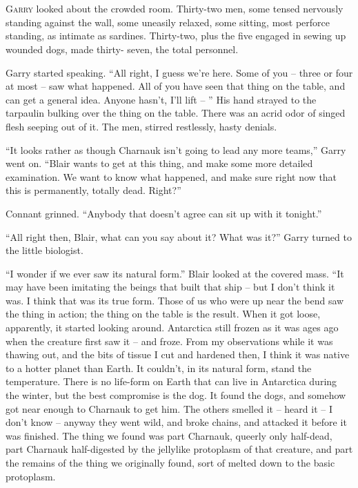 \documentclass[letterpaper,openany,12pt]{memoir}		%
\begin{document}
\chapter[Chapter 6]{}

\lettrine[lines=3,findent=2pt,nindent=2pt]{G}{arry} looked about the crowded
room. Thirty-two men, some tensed nervously standing against the wall, some
uneasily relaxed, some sitting, most perforce standing, as intimate as sardines.
Thirty-two, plus the five engaged in sewing up wounded dogs, made thirty- seven,
the total personnel.

Garry started speaking. ``All right, I guess we're here. Some of you -- three or
four at most -- saw what happened. All of you have seen that thing on the table,
and can get a general idea. Anyone hasn't, I'll lift -- '' His hand strayed to
the tarpaulin bulking over the thing on the table. There was an acrid odor of
singed flesh seeping out of it. The men, stirred restlessly, hasty denials.

``It looks rather as though Charnauk isn't going to lead any more teams,'' Garry
went on. ``Blair wants to get at this thing, and make some more detailed
examination. We want to know what happened, and make sure right now that this is
permanently, totally dead. Right?''

Connant grinned. ``Anybody that doesn't agree can sit up with it tonight.''

``All right then, Blair, what can you say about it? What was it?'' Garry turned
to the little biologist.

``I wonder if we ever saw its natural form.'' Blair looked at the covered mass.
``It may have been imitating the beings that built that ship -- but I don't
think it was. I think that was its true form. Those of us who were up near the
bend saw the thing in action; the thing on the table is the result. When it got
loose, apparently, it started looking around. Antarctica still frozen as it was
ages ago when the creature first saw it -- and froze. From my observations while
it was thawing out, and the bits of tissue I cut and hardened then, I think it
was native to a hotter planet than Earth. It couldn't, in its natural form,
stand the temperature. There is no life-form on Earth that can live in
Antarctica during the winter, but the best compromise is the dog. It found the
dogs, and somehow got near enough to Charnauk to get him. The others smelled it
-- heard it -- I don't know -- anyway they went wild, and broke chains, and
attacked it before it was finished. The thing we found was part Charnauk,
queerly only half-dead, part Charnauk half-digested by the jellylike protoplasm
of that creature, and part the remains of the thing we originally found, sort of
melted down to the basic protoplasm.
\end{document}
